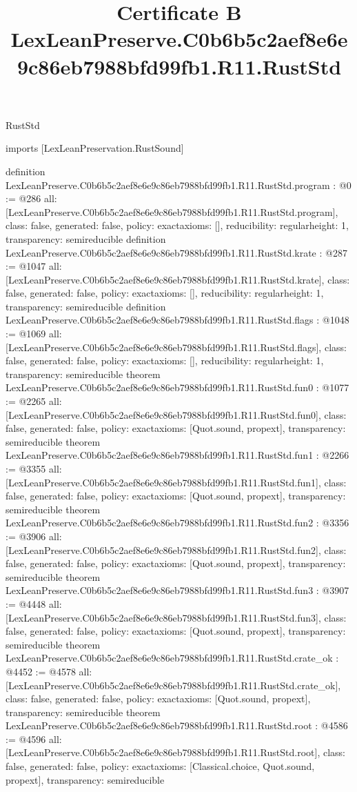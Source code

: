 \begin{lexlean}{RustStd}
\title{Certificate B LexLeanPreserve.C0b6b5c2aef8e6e9c86eb7988bfd99fb1.R11.RustStd}
\begin{coremodule}
imports [LexLeanPreservation.RustSound]

definition LexLeanPreserve.C0b6b5c2aef8e6e9c86eb7988bfd99fb1.R11.RustStd.program : @0 := @286 {
  all: [LexLeanPreserve.C0b6b5c2aef8e6e9c86eb7988bfd99fb1.R11.RustStd.program],
  class: false,
  generated: false,
  policy: exact{axioms: []},
  reducibility: regular{height: 1},
  transparency: semireducible
}
definition LexLeanPreserve.C0b6b5c2aef8e6e9c86eb7988bfd99fb1.R11.RustStd.krate : @287 := @1047 {
  all: [LexLeanPreserve.C0b6b5c2aef8e6e9c86eb7988bfd99fb1.R11.RustStd.krate],
  class: false,
  generated: false,
  policy: exact{axioms: []},
  reducibility: regular{height: 1},
  transparency: semireducible
}
definition LexLeanPreserve.C0b6b5c2aef8e6e9c86eb7988bfd99fb1.R11.RustStd.flags : @1048 := @1069 {
  all: [LexLeanPreserve.C0b6b5c2aef8e6e9c86eb7988bfd99fb1.R11.RustStd.flags],
  class: false,
  generated: false,
  policy: exact{axioms: []},
  reducibility: regular{height: 1},
  transparency: semireducible
}
theorem LexLeanPreserve.C0b6b5c2aef8e6e9c86eb7988bfd99fb1.R11.RustStd.fun0 : @1077 := @2265 {
  all: [LexLeanPreserve.C0b6b5c2aef8e6e9c86eb7988bfd99fb1.R11.RustStd.fun0],
  class: false,
  generated: false,
  policy: exact{axioms: [Quot.sound, propext]},
  transparency: semireducible
}
theorem LexLeanPreserve.C0b6b5c2aef8e6e9c86eb7988bfd99fb1.R11.RustStd.fun1 : @2266 := @3355 {
  all: [LexLeanPreserve.C0b6b5c2aef8e6e9c86eb7988bfd99fb1.R11.RustStd.fun1],
  class: false,
  generated: false,
  policy: exact{axioms: [Quot.sound, propext]},
  transparency: semireducible
}
theorem LexLeanPreserve.C0b6b5c2aef8e6e9c86eb7988bfd99fb1.R11.RustStd.fun2 : @3356 := @3906 {
  all: [LexLeanPreserve.C0b6b5c2aef8e6e9c86eb7988bfd99fb1.R11.RustStd.fun2],
  class: false,
  generated: false,
  policy: exact{axioms: [Quot.sound, propext]},
  transparency: semireducible
}
theorem LexLeanPreserve.C0b6b5c2aef8e6e9c86eb7988bfd99fb1.R11.RustStd.fun3 : @3907 := @4448 {
  all: [LexLeanPreserve.C0b6b5c2aef8e6e9c86eb7988bfd99fb1.R11.RustStd.fun3],
  class: false,
  generated: false,
  policy: exact{axioms: [Quot.sound, propext]},
  transparency: semireducible
}
theorem LexLeanPreserve.C0b6b5c2aef8e6e9c86eb7988bfd99fb1.R11.RustStd.crate_ok : @4452 := @4578 {
  all: [LexLeanPreserve.C0b6b5c2aef8e6e9c86eb7988bfd99fb1.R11.RustStd.crate_ok],
  class: false,
  generated: false,
  policy: exact{axioms: [Quot.sound, propext]},
  transparency: semireducible
}
theorem LexLeanPreserve.C0b6b5c2aef8e6e9c86eb7988bfd99fb1.R11.RustStd.root : @4586 := @4596 {
  all: [LexLeanPreserve.C0b6b5c2aef8e6e9c86eb7988bfd99fb1.R11.RustStd.root],
  class: false,
  generated: false,
  policy: exact{axioms: [Classical.choice, Quot.sound, propext]},
  transparency: semireducible
}


\end{coremodule}
\end{lexlean}
